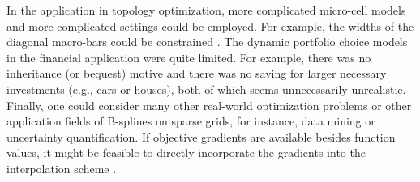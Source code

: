 In the application in topology optimization,
more complicated micro-cell models and more complicated
settings could be employed.
For example, the widths of the diagonal macro-bars could be constrained
\cite{Allaire16Towards}.
The dynamic portfolio choice models in the financial application
were quite limited.
For example, there was no inheritance (or bequest) motive
and there was no saving for larger necessary investments
(e.g., cars or houses), both of which seems unnecessarily unrealistic.
Finally, one could consider many other real-world optimization problems
or other application fields of B-splines on sparse grids,
for instance, data mining or uncertainty quantification.
If objective gradients are available besides function values,
it might be feasible to directly incorporate the gradients into
the interpolation scheme \cite{Baar15Gradient}.


  
  
  
  
  
  
  
  
  
